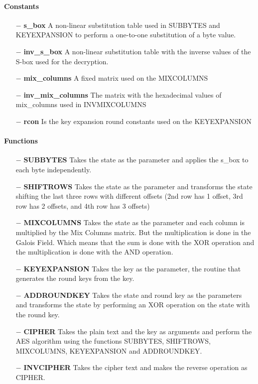 \paragraph{Constants}\cite{nist_aes}
\begin{itemize}
    \item [$-$] \textbf{s\_box} A non-linear substitution table used in SUBBYTES and KEYEXPANSION to perform a one-to-one substitution of a byte value.
    \item [$-$] \textbf{inv\_s\_box} A non-linear substitution table with the inverse values of the S-box used for the decryption.
    \item [$-$] \textbf{mix\_columns} A fixed matrix used on the MIXCOLUMNS
    \item [$-$] \textbf{inv\_mix\_columns} The matrix with the hexadecimal values of mix\_columns used in INVMIXCOLUMNS
    \item [$-$] \textbf{rcon} Is the key expansion round constants used on the KEYEXPANSION
\end{itemize}
\paragraph{Functions}\cite{nist_aes}
\begin{itemize}
    \item [$-$] \textbf{SUBBYTES} Takes the state as the parameter and applies the s\_box to each byte independently.
    \item [$-$] \textbf{SHIFTROWS} Takes the state as the parameter and transforms the state shifting the last three rows with different offsets (2nd row has 1 offset, 3rd row has 2 offsets, and 4th row has 3 offsets)
    \item [$-$] \textbf{MIXCOLUMNS} Takes the state as the parameter and each column is multiplied by the Mix Columns matrix. But the multiplication is done in the Galois Field. Which means that the sum is done with the XOR operation and the multiplication is done with the AND operation.
    \item [$-$] \textbf{KEYEXPANSION} Takes the key as the parameter, the routine that generates the round keys from the key.
    \item [$-$] \textbf{ADDROUNDKEY} Takes the state and round key as the parameters and transforms the state by performing an XOR operation on the state with the round key.
    \item [$-$] \textbf{CIPHER} Takes the plain text and the key as arguments and perform the AES algorithm using the functions SUBBYTES, SHIFTROWS, MIXCOLUMNS, KEYEXPANSION and ADDROUNDKEY.
    \item [$-$] \textbf{INVCIPHER} Takes the cipher text and makes the reverse operation as CIPHER.
\end{itemize}


